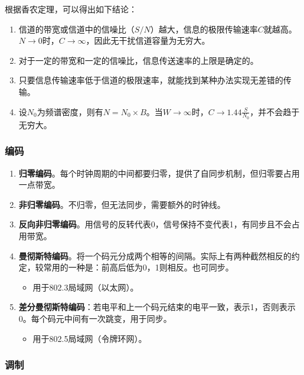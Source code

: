 \documentclass[12pt, a4paper, oneside]{ctexart}
\begin{document}
根据香农定理，可以得出如下结论：
\begin{enumerate}
    \item 信道的带宽或信道中的信噪比（$S/N$）越大，信息的极限传输速率$C$就越高。$N\to 0$时，$C\to\infty$，因此无干扰信道容量为无穷大。
    \item 对于一定的带宽和一定的信噪比，信息传送速率的上限是确定的。
    \item 只要信息传输速率低于信道的极限速率，就能找到某种办法实现无差错的传输。
    \item 设$N_0$为频谱密度，则有$N=N_0\times B$。当$W\to \infty$时，$C\to 1.44\frac{S}{N_0}$，并不会趋于无穷大。
\end{enumerate}

\subsubsection{编码}

\begin{enumerate}
    \item {\bf 归零编码}。每个时钟周期的中间都要归零，提供了自同步机制，但归零要占用一点带宽。
    \item {\bf 非归零编码}。不归零，但无法同步，需要额外的时钟线。
    \item {\bf 反向非归零编码}。用信号的反转代表0，信号保持不变代表1，有同步且不会占用带宽。
    \item {\bf 曼彻斯特编码}。将一个码元分成两个相等的间隔。实际上有两种截然相反的约定，较常用的一种是：前高后低为0，1则相反。也可同步。
    \begin{itemize}
        \item 用于802.3局域网（以太网）。
    \end{itemize}
    \item {\bf 差分曼彻斯特编码}：若电平和上一个码元结束的电平一致，表示1，否则表示0。每个码元中间有一次跳变，用于同步。
    \begin{itemize}
        \item 用于802.5局域网（令牌环网）。
    \end{itemize}
\end{enumerate}

\subsubsection{调制}
\end{document}

